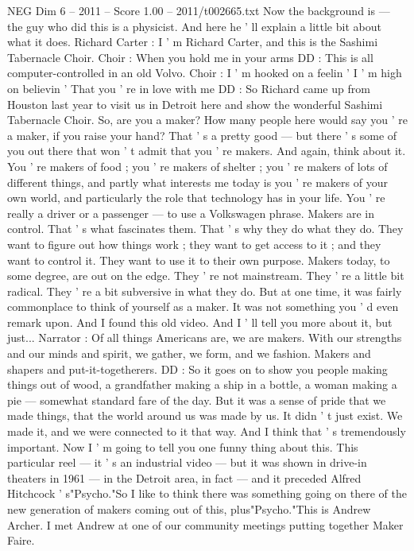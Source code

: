 \begin{textsample}{NEG Dim 6 – 2011 – Score 1.00 – 2011/t002665.txt}
Now the background is — the guy who did this is a physicist.
And here he ' ll explain a little bit about what it does.
Richard Carter : I ' m Richard Carter, and this is the Sashimi Tabernacle Choir.
Choir : When you hold me in your arms DD : This is all computer-controlled in an old Volvo.
Choir : I ' m hooked on a feelin ' I ' m high on believin ' That you ' re in love with me DD : So Richard came up from Houston last year to visit us in Detroit here and show the wonderful Sashimi Tabernacle Choir.
So, are you a maker?
How many people here would say you ' re a maker, if you raise your hand?
That ' s a pretty good — but there ' s some of you out there that won ' t admit that you ' re makers.
And again, think about it.
You ' re makers of food ; you ' re makers of shelter ; you ' re makers of lots of different things, and partly what interests me today is you ' re makers of your own world, and particularly the role that technology has in your life.
You ' re really a driver or a passenger — to use a Volkswagen phrase.
Makers are in control.
That ' s what fascinates them.
That ' s why they do what they do.
They want to figure out how things work ; they want to get access to it ; and they want to control it.
They want to use it to their own purpose.
Makers today, to some degree, are out on the edge.
They ' re not mainstream.
They ' re a little bit radical.
They ' re a bit subversive in what they do.
But at one time, it was fairly commonplace to think of yourself as a maker.
It was not something you ' d even remark upon.
And I found this old video.
And I ' ll tell you more about it, but just...
Narrator : Of all things Americans are, we are makers.
With our strengths and our minds and spirit, we gather, we form, and we fashion.
Makers and shapers and put-it-togetherers.
DD : So it goes on to show you people making things out of wood, a grandfather making a ship in a bottle, a woman making a pie — somewhat standard fare of the day.
But it was a sense of pride that we made things, that the world around us was made by us.
It didn ' t just exist.
We made it, and we were connected to it that way.
And I think that ' s tremendously important.
Now I ' m going to tell you one funny thing about this.
This particular reel — it ' s an industrial video — but it was shown in drive-in theaters in 1961 — in the Detroit area, in fact — and it preceded Alfred Hitchcock ' s"Psycho."So I like to think there was something going on there of the new generation of makers coming out of this, plus"Psycho."This is Andrew Archer.
I met Andrew at one of our community meetings putting together Maker Faire.

\end{textsample}
